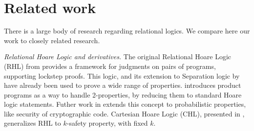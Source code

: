 \section{Related work}

There is a large body of research regarding relational logics. We compare here our work to closely related research.

\emph{Relational Hoare Logic and derivatives.} The original Relational Hoare Logic (RHL) from \citet{Benton04} provides a framework for judgments on pairs of programs, supporting lockstep proofs. This logic, and its extension to Separation logic by \citet{Yang07} have already been used to prove a wide range of properties.\citet{BartheCK11} introduces product programs as a way to handle 2-properties, by reducing them to standard Hoare logic statements. Futher work in \citet{BartheKOB13, BartheGHS17} extends this concept to probabilistic properties, like security of cryptographic code. Cartesian Hoare Logic (CHL), presented in \citet{SousaD16}, generalizes RHL to $k$-safety property, with fixed $k$. 
